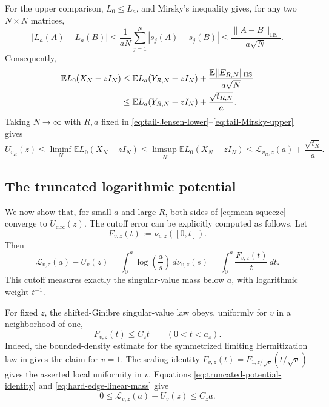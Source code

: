 \documentclass[11pt,reqno]{amsart}
\numberwithin{equation}{section}
\theoremstyle{definition}
\theoremstyle{remark}
\newcommand{\E}{\mathbb E}
\newcommand{\1}{\mathbf 1}
\newcommand{\HS}{\mathrm{HS}}
\newcommand{\cir}{\mathrm{circ}}
\begin{document}
For the upper comparison, $L_0\le L_a$, and Mirsky's inequality gives, for
any two $N\times N$ matrices,
\begin{equation}\label{eq:Mirsky-La}
 |L_a(A)-L_a(B)|
 \le\frac1{aN}\sum_{j=1}^N|s_j(A)-s_j(B)|
 \le\frac{\|A-B\|_{\HS}}{a\sqrt N}.
\end{equation}
Consequently,
\begin{align}
 \E L_0(X_N-zI_N)
 &\le\E L_a(Y_{R,N}-zI_N)
 +\frac{\E\|E_{R,N}\|_{\HS}}{a\sqrt N} \notag\\
 &\le\E L_a(Y_{R,N}-zI_N)+\frac{\sqrt{t_{R,N}}}{a}.
 \label{eq:tail-Mirsky-upper}
\end{align}
Taking $N\to\infty$ with $R,a$ fixed in
\eqref{eq:tail-Jensen-lower}--\eqref{eq:tail-Mirsky-upper} gives
\begin{equation}\label{eq:mean-squeeze}
 U_{v_R}(z)
 \le\liminf_N\E L_0(X_N-zI_N)
 \le\limsup_N\E L_0(X_N-zI_N)
 \le\mathcal L_{v_R,z}(a)+\frac{\sqrt{t_R}}a.
\end{equation}

\subsection{The truncated logarithmic potential}
We now show that, for small \(a\) and large \(R\), both sides of
\eqref{eq:mean-squeeze} converge to \(U_{\cir}(z)\).
The cutoff error can be explicitly computed as follows.
Let
\[
 F_{v,z}(t):=\nu_{v,z}([0,t]).
\]
Then
\begin{equation}\label{eq:truncated-potential-identity}
 \mathcal L_{v,z}(a)-U_v(z)
 =\int_0^a\log\!\left(\frac as\right)\,d\nu_{v,z}(s)
 =\int_0^a\frac{F_{v,z}(t)}t\,dt.
\end{equation}
This cutoff measures exactly the singular-value mass below $a$, with logarithmic weight $t^{-1}$.

For fixed $z$, the shifted-Ginibre singular-value law obeys, uniformly for
$v$ in a neighborhood of one,
\begin{equation}\label{eq:hard-edge-linear-mass}
 F_{v,z}(t)\le C_z t\qquad(0<t<a_z).
\end{equation}
Indeed, the bounded-density estimate for the symmetrized limiting
Hermitization law in \cite[proof of Theorem~3.6, (3.15)]{Han2410} gives the
claim for $v=1$.  The scaling identity
$F_{v,z}(t)=F_{1,z/\sqrt v}(t/\sqrt v)$ gives the asserted local uniformity
in $v$.
Equations \eqref{eq:truncated-potential-identity} and
\eqref{eq:hard-edge-linear-mass} give
\begin{equation}\label{eq:truncated-potential-bound}
 0\le\mathcal L_{v,z}(a)-U_v(z)\le C_z a.
\end{equation}
\end{document}
